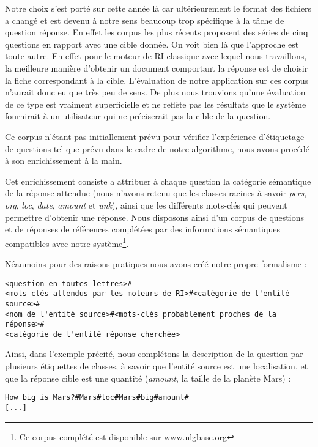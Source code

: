 \documentclass[10pt,a4paper]{article}
\begin{document}
\par Notre choix s'est porté sur cette année là car ultérieurement le format des fichiers a changé et est devenu à notre sens beaucoup trop spécifique à la tâche de question réponse. En effet les corpus les plus récents proposent des séries de cinq questions en rapport avec une cible donnée. On voit bien là que l'approche est toute autre. En effet pour le moteur de RI classique avec lequel nous travaillons, la meilleure manière d'obtenir un document comportant la réponse est de choisir la fiche correspondant à la cible. L'évaluation de notre application sur ces corpus n'aurait donc eu que très peu de sens. De plus nous trouvions qu'une évaluation de ce type est vraiment superficielle et ne reflète pas les résultats que le système fournirait à un utilisateur qui ne préciserait pas la cible de la question. 
\par Ce corpus n'étant pas initiallement prévu pour vérifier l'expérience d'étiquetage de questions tel que prévu dans le cadre de notre algorithme, nous avons procédé à son enrichissement \og{}à la main\fg{}.
\par Cet enrichissement consiste a attribuer à chaque question la catégorie sémantique de la réponse attendue (nous n'avons retenu que les classes racines à savoir \emph{pers}, \emph{org}, \emph{loc}, \emph{date}, \emph{amount} et \emph{unk}), ainsi que les différents mots-clés qui peuvent permettre d'obtenir une réponse. Nous disposons ainsi d'un corpus de questions et de réponses de références complétées par des informations sémantiques compatibles avec notre système\footnote{Ce corpus complété est disponible sur www.nlgbase.org}. 
\par Néanmoins pour des raisons pratiques nous avons créé notre propre formalisme :
\begin{verbatim}
<question en toutes lettres>#
<mots-clés attendus par les moteurs de RI>#<catégorie de l'entité source>#
<nom de l'entité source>#<mots-clés probablement proches de la réponse>#
<catégorie de l'entité réponse cherchée> 
\end{verbatim}

\par Ainsi, dans l'exemple précité, nous complétons la description de la question par plusieurs étiquettes de classes, à savoir que l'entité source est une localisation, et que la réponse cible est une quantité (\emph{amount}, la taille de la planète Mars) :

\begin{verbatim}
How big is Mars?#Mars#loc#Mars#big#amount#
[...]
\end{verbatim}
\end{document}
